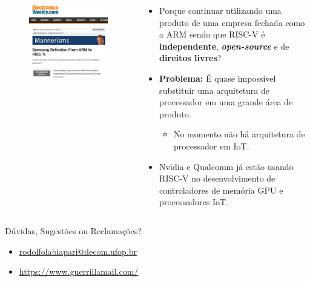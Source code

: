 \documentclass[red, aspectratio=169, xcolor=dvipsnames]{beamer}
\let\olditem=\item%
\renewcommand{\item}{\olditem \justifying}
\begin{document}
\begin{frame}[plain]
	\begin{columns}
		\begin{column}{0.48\textwidth}
			\begin{figure}
				\centering
				\label{fig:samsung2}
				\includegraphics[width=1.05\textwidth]{img/samsung.png}
			\end{figure}
		\end{column}
		\begin{column}{0.5\textwidth}
			\pause
			\begin{itemize}
				\setlength{\itemsep}{1em}
				\item Porque continuar utilizando uma produto de uma empresa fechada como a ARM sendo que RISC-V é \textbf{independente}, \textbf{\textit{open-source}} e de \textbf{direitos livres}?
				
				\pause

				\item \textbf{Problema:} É quase impossível substituir uma arquitetura de processador em uma grande área de produto.
				\pause
				\begin{itemize}
					\item No momento não há arquitetura de processador em IoT.
				\end{itemize}

				\bigskip

				\item Nvidia e Qualcomm já estão usando RISC-V no desenvolvimento de controladores de memória GPU e processadores IoT.
			\end{itemize}
		\end{column}
	\end{columns}
\end{frame}

\begin{frame}{Dúvidas, Sugestões ou Reclamações?}
	\begin{itemize}
		\item \url{rodolfolabiapari@decom.ufop.br} \\[1cm]
		\item \url{https://www.guerrillamail.com/}
	\end{itemize}
\end{frame}

\frame{\titlepage}
\end{document}
